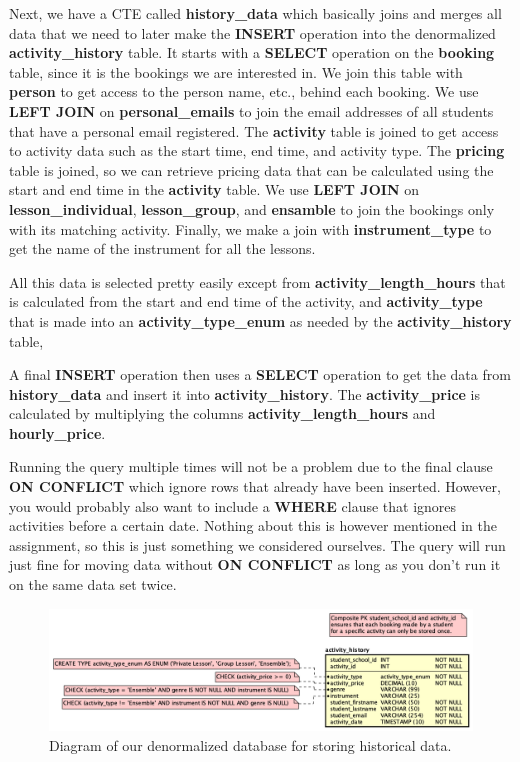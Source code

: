 \documentclass[a4paper]{scrartcl}
\begin{document}
Next, we have a CTE called \textbf{history\_data} which basically joins and merges all data that we need to later make the \textbf{INSERT} operation into the denormalized \textbf{activity\_history} table. It starts with a \textbf{SELECT} operation on the \textbf{booking} table, since it is the bookings we are interested in. We join this table with \textbf{person} to get access to the person name, etc., behind each booking. We use \textbf{LEFT JOIN} on \textbf{personal\_emails} to join the email addresses of all students that have a personal email registered. The \textbf{activity} table is joined to get access to activity data such as the start time, end time, and activity type. The \textbf{pricing} table is joined, so we can retrieve pricing data that can be calculated using the start and end time in the \textbf{activity} table. We use \textbf{LEFT JOIN} on \textbf{lesson\_individual}, \textbf{lesson\_group}, and \textbf{ensamble} to join the bookings only with its matching activity. Finally, we make a join with \textbf{instrument\_type} to get the name of the instrument for all the lessons.

All this data is selected pretty easily except from \textbf{activity\_length\_hours} that is calculated from the start and end time of the activity, and \textbf{activity\_type} that is made into an \textbf{activity\_type\_enum} as needed by the \textbf{activity\_history} table,

A final \textbf{INSERT} operation then uses a \textbf{SELECT} operation to get the data from \textbf{history\_data} and insert it into \textbf{activity\_history}. The \textbf{activity\_price} is calculated by multiplying the columns \textbf{activity\_length\_hours} and \textbf{hourly\_price}.

Running the query multiple times will not be a problem due to the final clause \textbf{ON CONFLICT} which ignore rows that already have been inserted. However, you would probably also want to include a \textbf{WHERE} clause that ignores activities before a certain date. Nothing about this is however mentioned in the assignment, so this is just something we considered ourselves. The query will run just fine for moving data without \textbf{ON CONFLICT} as long as you don't run it on the same data set twice.

\begin{figure}[H]
    \begin{center}
      \includegraphics[scale=0.4]{Denormalized Historical Database.png}
      \caption{Diagram of our denormalized database for storing historical data.}
      \label{fig:diag}
    \end{center}
  \end{figure}
\end{document}
